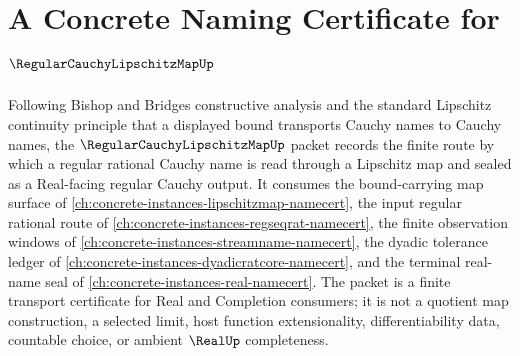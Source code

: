 \chapter{A Concrete Naming Certificate for $\RegularCauchyLipschitzMapUp$}
\label{ch:concrete-instances-regular-cauchy-lipschitz-map-namecert}

Following Bishop and Bridges constructive analysis and the standard Lipschitz continuity principle that a displayed bound transports Cauchy names to Cauchy names, the $\RegularCauchyLipschitzMapUp$ packet records the finite route by which a regular rational Cauchy name is read through a Lipschitz map and sealed as a Real-facing regular Cauchy output. It consumes the bound-carrying map surface of \autoref{ch:concrete-instances-lipschitzmap-namecert}, the input regular rational route of \autoref{ch:concrete-instances-regseqrat-namecert}, the finite observation windows of \autoref{ch:concrete-instances-streamname-namecert}, the dyadic tolerance ledger of \autoref{ch:concrete-instances-dyadicratcore-namecert}, and the terminal real-name seal of \autoref{ch:concrete-instances-real-namecert}. The packet is a finite transport certificate for Real and Completion consumers; it is not a quotient map construction, a selected limit, host function extensionality, differentiability data, countable choice, or ambient $\RealUp$ completeness.

